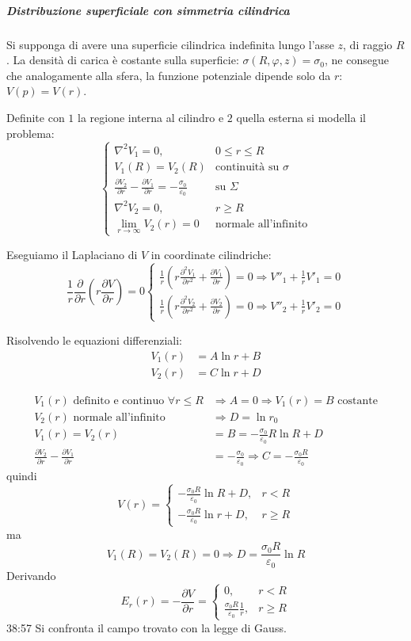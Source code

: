 \newpage
\subparagraph{Distribuzione superficiale con simmetria cilindrica}
Si supponga di avere una superficie cilindrica indefinita lungo l'asse $z$, di raggio $R$.
La densità di carica è costante sulla superficie: $\sigma(R,\varphi,z) = \sigma_0$, ne consegue che
analogamente alla sfera, la funzione potenziale dipende solo da $r$: $V(p)=V(r)$.

Definite con $1$ la regione interna al cilindro e $2$ quella esterna si modella il problema:
$$
\begin{cases}
\nabla^2 V_1 = 0, & 0\leq r\leq R\\
V_1(R) = V_2(R) & \text{continuità su }\sigma \\
\frac{\partial V_2}{\partial r} - \frac{\partial V_1}{\partial r} = -\frac{\sigma_0}{\varepsilon_0} & \text{su } \Sigma\\
\nabla^2 V_2 = 0, & r\geq R\\
\lim_{r\to \infty}V_2(r) = 0 & \text{normale all'infinito}
\end{cases}
$$

Eseguiamo il Laplaciano di $V$ in coordinate cilindriche:
$$
\frac{1}{r}\frac{\partial}{\partial r} \left(r\frac{\partial V}{\partial r}\right) = 0 \begin{cases}
\frac{1}{r}\left(r \frac{\partial^2 V_1}{\partial r^2} + 
\frac{\partial V_1}{\partial r}\right) = 0\Rightarrow V''_1 + 
\frac{1}{r}V'_1 = 0\\
\frac{1}{r}\left(r \frac{\partial^2 V_2}{\partial r^2} + 
\frac{\partial V_2}{\partial r}\right) = 0\Rightarrow V''_2 + 
\frac{1}{r}V'_2 = 0
\end{cases}
$$

Risolvendo le equazioni differenziali:
\begin{align*}
V_1(r) &= A \ln r + B\\
V_2(r) &= C \ln r + D
\end{align*}

\begin{align*}
V_1(r) \text{ definito e continuo } 
\forall r\leq R & \Rightarrow A = 0 \Rightarrow V_1(r) = B 
\text{ costante}\\
V_2(r) \text{ normale all'infinito} &\Rightarrow D = \ln r_0\\
V_1(r) = V_2(r) &= B = -\frac{\sigma_0}{\varepsilon_0}R\ln R + D\\
\frac{\partial V_2}{\partial r} - \frac{\partial V_1}{\partial r} &= -\frac{\sigma_0}{\varepsilon_0}
\Rightarrow C = -\frac{\sigma_0 R}{\varepsilon_0}
\end{align*}
quindi
$$
V(r) = \begin{cases}
-\frac{\sigma_0 R}{\varepsilon_0} \ln R + D,& r < R\\
-\frac{\sigma_0 R}{\varepsilon_0} \ln r + D,& r \geq R
\end{cases}
$$
ma
$$
V_1(R) = V_2(R) = 0\Rightarrow D = \frac{\sigma_0 R}{\varepsilon_0} \ln R
$$
Derivando
$$
E_r (r) = -\frac{\partial V}{\partial r} = \begin{cases}
0, & r < R\\
\frac{\sigma_0 R}{\varepsilon_0}\frac{1}{r},& r\geq R
\end{cases}
$$
38:57
Si confronta il campo trovato con la legge di Gauss.

